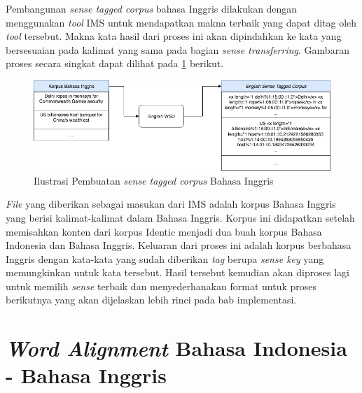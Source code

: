 Pembangunan \textit{sense tagged corpus} bahasa Inggris dilakukan dengan menggunakan \textit{tool} IMS \citep{zhong2010makes} untuk mendapatkan makna terbaik yang dapat ditag oleh \textit{tool} tersebut. Makna kata hasil dari proses ini akan dipindahkan ke kata yang bersesuaian pada kalimat yang sama pada bagian \textit{sense transferring}. Gambaran proses secara singkat dapat dilihat pada \ref{fig:producing-en-tag-corpus} berikut.


\begin{figure}
	\centering
	\includegraphics[width=1\linewidth]{adit_pics/bab-3-en-tag-corpus.png}
	\caption{Ilustrasi Pembuatan \textit{sense tagged corpus} Bahasa Inggris}
	\label{fig:producing-en-tag-corpus}
\end{figure}

\textit{File} yang diberikan sebagai masukan dari IMS adalah korpus Bahasa Inggris yang berisi kalimat-kalimat  dalam Bahasa Inggris. Korpus ini didapatkan setelah memisahkan konten dari korpus Identic menjadi dua buah korpus Bahasa Indonesia dan Bahasa Inggris. Keluaran dari proses ini adalah korpus berbahasa Inggris dengan kata-kata yang sudah diberikan \textit{tag} berupa \textit{sense key} yang memungkinkan untuk kata tersebut. Hasil tersebut kemudian akan diproses lagi untuk memilih \textit{sense} terbaik dan menyederhanakan format untuk proses berikutnya yang akan dijelaskan lebih rinci pada bab implementasi.
\section{\textit{Word Alignment} Bahasa Indonesia - Bahasa Inggris}

